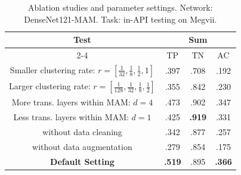 \documentclass[sigconf]{acmart}
\begin{document}
\begin{table}[!t]
\centering
  \caption{Ablation studies and parameter settings. Network: DenseNet121-MAM. Task: in-API testing on Megvii.}
\label{table_ablation}
\begin{tabular}{c|ccc}
\hline
\multirow{2}{*}{Test} &\multicolumn{3}{c}{Sum} \\
  \cline{2-4}  & TP & TN & AC \\

\hline
\hline
Smaller clustering rate: $r=[\frac{1}{32},\frac{1}{8},\frac{1}{2},1]$ & .397 & .708 & .192 \\
Larger clustering rate: $r=[\frac{1}{128},\frac{1}{32},\frac{1}{8},\frac{1}{2}]$ & .355 & .842 & .230 \\
More trans. layers within MAM: $d=4$ & .473 & .902 & .347\\
Less trans. layers within MAM: $d=1$ &.425&\textbf{.919}&.331\\
without data cleaning & .342 & .877 & .257\\
without data augmentation & .279 & .854 & .175\\
\textbf{Default Setting}  & \textbf{.519}  & .895 & \textbf{.366} \\
\hline
\end{tabular}
\end{table}
\end{document}
